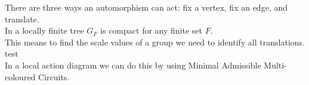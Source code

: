 \documentclass[preview]{standalone}
\begin{document}
There are three ways an automorphism can act: fix a vertex, fix an edge, and translate.\\In a locally finite tree $G_F$ is compact for any finite set $F$.\\This means to find the scale values of a group we need to identify all translations. test\\In a local action diagram we can do this by using Minimal Admissible Multi-coloured Circuits.\\
\end{document}
